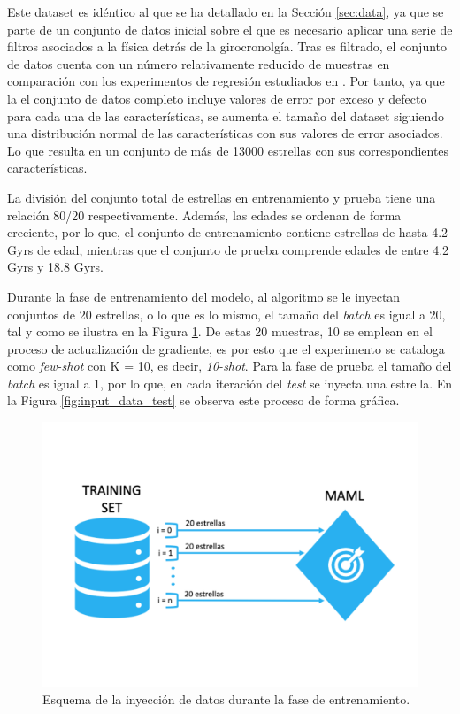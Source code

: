Este dataset es idéntico al que se ha detallado en la Sección \ref{sec:data}, ya que se parte de un conjunto de datos inicial sobre el que es necesario aplicar una serie de filtros asociados a la física detrás de la girocronolgía. Tras es filtrado, el conjunto de datos cuenta con un número relativamente reducido de muestras en comparación con los experimentos de regresión estudiados en \cite{finn2017modelagnostic}. Por tanto, ya que la el conjunto de datos completo incluye valores de error por exceso y defecto para cada una de las características, se aumenta el tamaño del dataset siguiendo una distribución normal de las características con sus valores de error asociados. Lo que resulta en un conjunto de más de 13000 estrellas con sus correspondientes características. %

La división del conjunto total de estrellas en entrenamiento y prueba tiene una relación 80/20 respectivamente. Además, las edades se ordenan de forma creciente, por lo que, el conjunto de entrenamiento contiene estrellas de hasta 4.2 Gyrs de edad, mientras que el conjunto de prueba comprende edades de entre 4.2 Gyrs y 18.8 Gyrs.

Durante la fase de entrenamiento del modelo, al algoritmo se le inyectan conjuntos de 20 estrellas, o lo que es lo mismo, el tamaño del \emph{batch} es igual a 20, tal y como se ilustra en la Figura \ref{fig:input_data_train}. De estas 20 muestras, 10 se emplean en el proceso de actualización de gradiente, es por esto que el experimento se cataloga como \emph{few-shot} con K = 10, es decir, \emph{10-shot}. Para la fase de prueba el tamaño del \emph{batch} es igual a 1, por lo que, en cada iteración del \emph{test} se inyecta una estrella. En la Figura \ref{fig:input_data_test} se observa este proceso de forma gráfica.

\begin{figure}[H]
\begin{center}
 \includegraphics[width=0.8\linewidth]{Figuras/MAML/train_data.pdf}
\end{center}
\caption{Esquema de la inyección de datos durante la fase de entrenamiento.}
 \label{fig:input_data_train}
\end{figure}

